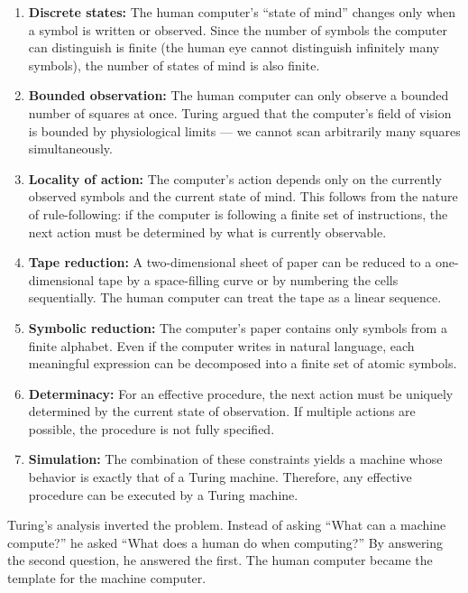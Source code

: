\begin{enumerate}
\item \textbf{Discrete states:} The human computer's ``state of mind'' changes only when a symbol is written or observed. Since the number of symbols the computer can distinguish is finite (the human eye cannot distinguish infinitely many symbols), the number of states of mind is also finite.

\item \textbf{Bounded observation:} The human computer can only observe a bounded number of squares at once. Turing argued that the computer's field of vision is bounded by physiological limits --- we cannot scan arbitrarily many squares simultaneously.

\item \textbf{Locality of action:} The computer's action depends only on the currently observed symbols and the current state of mind. This follows from the nature of rule-following: if the computer is following a finite set of instructions, the next action must be determined by what is currently observable.

\item \textbf{Tape reduction:} A two-dimensional sheet of paper can be reduced to a one-dimensional tape by a space-filling curve or by numbering the cells sequentially. The human computer can treat the tape as a linear sequence.

\item \textbf{Symbolic reduction:} The computer's paper contains only symbols from a finite alphabet. Even if the computer writes in natural language, each meaningful expression can be decomposed into a finite set of atomic symbols.

\item \textbf{Determinacy:} For an effective procedure, the next action must be uniquely determined by the current state of observation. If multiple actions are possible, the procedure is not fully specified.

\item \textbf{Simulation:} The combination of these constraints yields a machine whose behavior is exactly that of a Turing machine. Therefore, any effective procedure can be executed by a Turing machine.
\end{enumerate}

Turing's analysis inverted the problem. Instead of asking ``What can a machine compute?'' he asked ``What does a human do when computing?'' By answering the second question, he answered the first. The human computer became the template for the machine computer.

